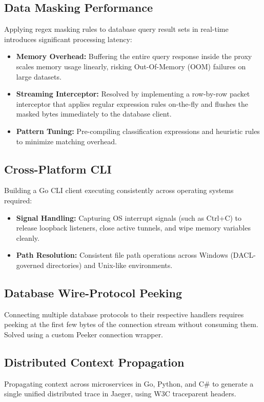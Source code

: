 \subsection{Data Masking Performance}

Applying regex masking rules to database query result sets in real-time introduces significant processing latency:
\begin{itemize}
    \item \textbf{Memory Overhead:} Buffering the entire query response inside the proxy scales memory usage linearly, risking Out-Of-Memory (OOM) failures on large datasets.
    \item \textbf{Streaming Interceptor:} Resolved by implementing a row-by-row packet interceptor that applies regular expression rules on-the-fly and flushes the masked bytes immediately to the database client.
    \item \textbf{Pattern Tuning:} Pre-compiling classification expressions and heuristic rules to minimize matching overhead.
\end{itemize}

\subsection{Cross-Platform CLI}

Building a Go CLI client executing consistently across operating systems required:
\begin{itemize}
    \item \textbf{Signal Handling:} Capturing OS interrupt signals (such as Ctrl+C) to release loopback listeners, close active tunnels, and wipe memory variables cleanly.
    \item \textbf{Path Resolution:} Consistent file path operations across Windows (DACL-governed directories) and Unix-like environments.
\end{itemize}

\subsection{Database Wire-Protocol Peeking}

Connecting multiple database protocols to their respective handlers requires peeking at the first few bytes of the connection stream without consuming them. Solved using a custom Peeker connection wrapper.

\subsection{Distributed Context Propagation}

Propagating context across microservices in Go, Python, and C\# to generate a single unified distributed trace in Jaeger, using W3C traceparent headers.
